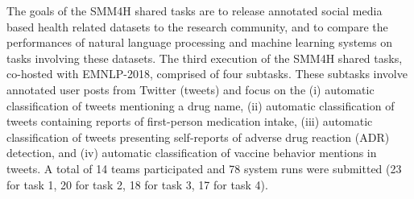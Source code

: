 The goals of the SMM4H shared tasks are to release annotated social media based health related datasets to the research community, and to compare the performances of natural language processing and machine learning systems on tasks involving these datasets. The third execution of the SMM4H shared tasks, co-hosted with EMNLP-2018, comprised of four subtasks. These subtasks involve annotated user posts from Twitter (tweets) and focus on the (i) automatic classification of tweets mentioning a drug name, (ii) automatic classification of tweets containing reports of first-person medication intake, (iii) automatic classification of tweets presenting self-reports of adverse drug reaction (ADR) detection, and (iv) automatic classification of vaccine behavior mentions in tweets. A total of 14 teams participated and 78 system runs were submitted (23 for task 1, 20 for task 2, 18 for task 3, 17 for task 4).
